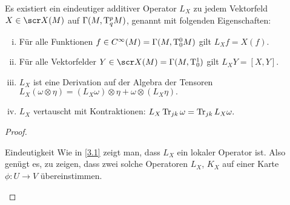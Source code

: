 \begin{st} \label{5.19}
    Es existiert ein eindeutiger additiver Operator $L_X$ zu jedem Vektorfeld $X \in \scr X(M)$ auf $\Gamma(M, \mathrm{T}_q^p M)$, genannt  mit folgenden Eigenschaften:
    \begin{enumerate}[(i)]
        \item
            Für alle Funktionen $f \in C^\infty(M) = \Gamma(M, \mathrm{T}_0^0 M)$ gilt
            \begin{math}
                L_X f = X(f).
            \end{math}
        \item
            Für alle Vektorfelder $Y \in \scr X(M) = \Gamma(M, \T_0^1)$ gilt
            \begin{math}
                L_X Y = [X, Y].
            \end{math}
        \item
            $L_X$ ist eine Derivation auf der Algebra der Tensoren
            \begin{math}
                L_X(\omega \otimes \eta) = (L_X \omega) \otimes \eta + \omega \otimes (L_X \eta).
            \end{math}
        \item
            $L_X$ vertauscht mit Kontraktionen:
            \begin{math}
                L_X \operatorname{Tr}_{jk} \omega = \operatorname{Tr}_{jk} L_X \omega.
            \end{math}
    \end{enumerate}
    \begin{proof}
        \begin{seg}{Eindeutigkeit}
            Wie in \ref{3.1} zeigt man, dass $L_X$ ein lokaler Operator ist.
            Also genügt es, zu zeigen, dass zwei solche Operatoren $L_X$, $K_X$ auf einer Karte $\phi: U \to V$ übereinstimmen.


\end{seg}
\end{proof}
\end{st}
